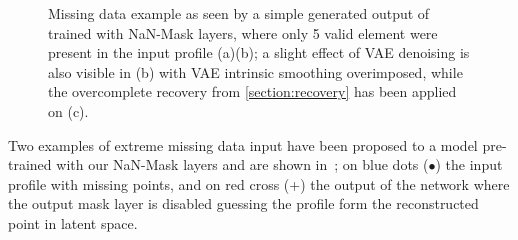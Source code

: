 \begin{figure}
    \centering
    \caption{Missing data example as seen by a simple generated output of  trained with NaN-Mask layers, where only 5 valid element were present in the input profile (a)(b); a slight effect of VAE denoising is also visible in (b) with VAE intrinsic smoothing overimposed, while the overcomplete recovery from \cref{section:recovery} has been applied on (c). }
    \label{fig:missing data example}
\end{figure}
Two examples of extreme missing data input have been proposed to a  model pre-trained with our NaN-Mask layers and are shown in~\Figure{\ref{fig:missing data example}}; on blue dots ($\bullet$) the input profile with missing points, and on red cross (+) the output of the network where the output mask layer is disabled guessing the profile form the reconstructed point in latent space.



